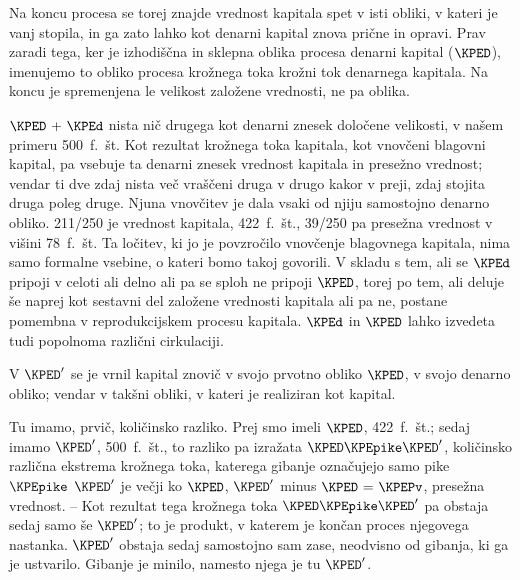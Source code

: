 \documentclass[kapital_02.tex]{subfiles}
\begin{document}
Na koncu procesa se torej znajde vrednost kapitala spet v isti obliki, v kateri je vanj stopila, in ga zato lahko kot denarni kapital znova prične in opravi. Prav zaradi tega, ker je izhodiščna in sklepna oblika procesa denarni kapital (\(\KPED\)), imenujemo to obliko procesa krožnega toka krožni tok denarnega kapitala. Na koncu je spremenjena le velikost založene vrednosti, ne pa oblika.

\(\KPED \textrm{ + } \KPEd\) nista nič drugega kot denarni znesek določene velikosti, v našem primeru 500\ f.\ št. Kot rezultat krožnega toka kapitala, kot vnovčeni blagovni kapital, pa vsebuje ta denarni znesek vrednost kapitala in presežno vrednost; vendar ti dve zdaj nista več vraščeni druga v drugo kakor v preji, zdaj stojita druga poleg druge. Njuna vnovčitev je dala vsaki od njiju samostojno denarno obliko. 211/250 je vrednost kapitala, 422\ f.\ št., 39/250 pa presežna vrednost v višini 78\ f.\ št. Ta ločitev, ki jo je povzročilo vnovčenje blagovnega kapitala, nima samo formalne vsebine, o kateri bomo takoj govorili. V skladu s tem, ali se \(\KPEd\) pripoji v celoti ali delno ali pa se sploh ne pripoji \(\KPED\), torej po tem, ali deluje še naprej kot sestavni del založene vrednosti kapitala ali pa ne, postane pomembna v reprodukcijskem procesu kapitala. \(\KPEd\) in \(\KPED\) lahko izvedeta tudi popolnoma različni cirkulaciji.

V \(\KPED'\) se je vrnil kapital znovič v svojo prvotno obliko \(\KPED\), v svojo denarno obliko; vendar v takšni obliki, v kateri je realiziran kot kapital.

Tu imamo, prvič, količinsko razliko. Prej smo imeli \(\KPED\), 422\ f.\ št.; sedaj imamo \(\KPED'\), 500\ f.\ št., to razliko pa izražata \(\KPED\KPEpike\KPED'\), \KPEstran količinsko različna ekstrema krožnega toka, katerega gibanje označujejo samo pike~\(\KPEpike\) \(\KPED'\) je večji ko \(\KPED\), \(\KPED'\) minus \(\KPED \textrm{ = } \KPEPv\), presežna vrednost. -- Kot rezultat tega krožnega toka \(\KPED\KPEpike\KPED'\) pa obstaja sedaj samo še \(\KPED'\); to je produkt, v katerem je končan proces njegovega nastanka. \(\KPED'\) obstaja sedaj samostojno sam zase, neodvisno od gibanja, ki ga je ustvarilo. Gibanje je minilo, namesto njega je tu \(\KPED'\).
\end{document}
